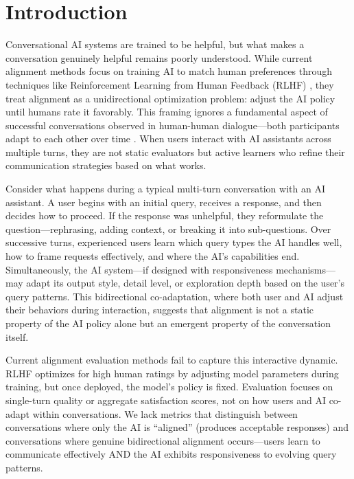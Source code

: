 \section{Introduction}

Conversational AI systems are trained to be helpful, but what makes a conversation genuinely helpful remains poorly understood. While current alignment methods focus on training AI to match human preferences through techniques like Reinforcement Learning from Human Feedback (RLHF) \cite{ouyang2022training, bai2022constitutional}, they treat alignment as a unidirectional optimization problem: adjust the AI policy until humans rate it favorably. This framing ignores a fundamental aspect of successful conversations observed in human-human dialogue---both participants adapt to each other over time \cite{pickering2004toward}. When users interact with AI assistants across multiple turns, they are not static evaluators but active learners who refine their communication strategies based on what works.

Consider what happens during a typical multi-turn conversation with an AI assistant. A user begins with an initial query, receives a response, and then decides how to proceed. If the response was unhelpful, they reformulate the question---rephrasing, adding context, or breaking it into sub-questions. Over successive turns, experienced users learn which query types the AI handles well, how to frame requests effectively, and where the AI's capabilities end. Simultaneously, the AI system---if designed with responsiveness mechanisms---may adapt its output style, detail level, or exploration depth based on the user's query patterns. This bidirectional co-adaptation, where both user and AI adjust their behaviors during interaction, suggests that alignment is not a static property of the AI policy alone but an emergent property of the conversation itself.

Current alignment evaluation methods fail to capture this interactive dynamic. RLHF optimizes for high human ratings by adjusting model parameters during training, but once deployed, the model's policy is fixed. Evaluation focuses on single-turn quality or aggregate satisfaction scores, not on how users and AI co-adapt within conversations. We lack metrics that distinguish between conversations where only the AI is ``aligned'' (produces acceptable responses) and conversations where genuine bidirectional alignment occurs---users learn to communicate effectively AND the AI exhibits responsiveness to evolving query patterns.

